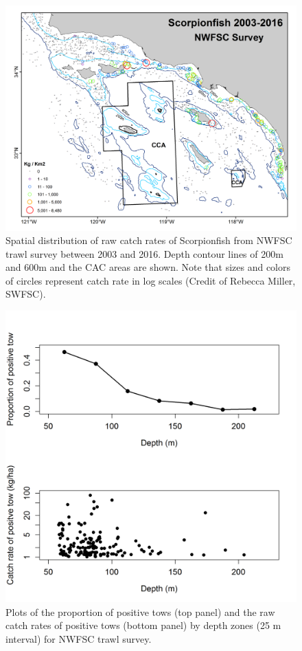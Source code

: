 \documentclass[12pt,]{article}
\begin{document}
\FloatBarrier

\begin{figure}[htbp]
\centering
\includegraphics{Figures/NWFSCtrawl_map.png}
\caption{Spatial distribution of raw catch rates of Scorpionfish from
NWFSC trawl survey between 2003 and 2016. Depth contour lines of 200m
and 600m and the CAC areas are shown. Note that sizes and colors of
circles represent catch rate in log scales (Credit of Rebecca Miller,
SWFSC). \label{fig:NWFSCtrawl_map}}
\end{figure}

\begin{figure}[htbp]
\centering
\includegraphics{Figures/NWFSCtrawl_posdepth.png}
\caption{Plots of the proportion of positive tows (top panel) and the
raw catch rates of positive tows (bottom panel) by depth zones (25 m
interval) for NWFSC trawl survey. \label{fig:NWFSCtrawl_posdepth}}
\end{figure}
\end{document}
